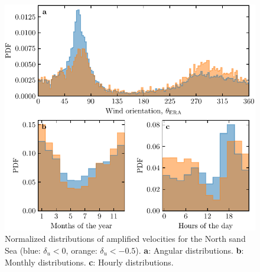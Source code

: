 \begin{figure}[p]
\centering
\includegraphics[scale=1]{Figures/Figure15_supp.pdf}
\caption{Normalized distributions of amplified velocities for the North sand Sea (blue: $\delta_u < 0$, orange: $\delta_u < -0.5$). \textbf{a}: Angular distributions. \textbf{b}: Monthly distributions. \textbf{c}: Hourly distributions.}
\label{Fig15_supp}
\end{figure}

